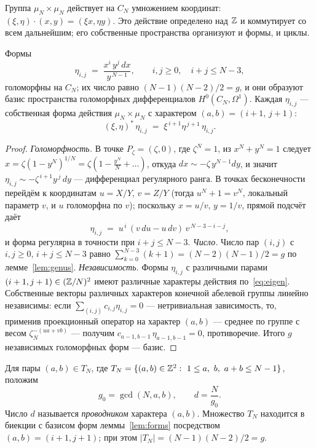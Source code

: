 Группа $\mu_N\times\mu_N$ действует на $C_N$ умножением координат:
$(\xi,\eta)\cdot(x,y)=(\xi x,\eta y)$. Это действие определено над
$\mathbb{Z}$ и коммутирует со всем дальнейшим; его собственные пространства
организуют и формы, и циклы.

\begin{lemma}\label{lem:forms}
Формы
\[
  \eta_{i,j} \;=\; \frac{x^i\,y^j\,dx}{y^{\,N-1}},
  \qquad i,j\ge 0,\quad i+j\le N-3,
\]
голоморфны на $C_N$; их число равно $(N-1)(N-2)/2=g$, и они образуют
базис пространства голоморфных дифференциалов $H^0(C_N,\Omega^1)$.
Каждая $\eta_{i,j}$ --- собственная форма действия $\mu_N\times\mu_N$
с характером $(a,b)=(i+1,\,j+1)$:
\begin{equation}\label{eq:eigen}
  (\xi,\eta)^*\,\eta_{i,j} \;=\; \xi^{\,i+1}\eta^{\,j+1}\,\eta_{i,j}.
\end{equation}
\end{lemma}

\begin{proof}
\emph{Голоморфность.} В точке $P_\zeta=(\zeta,0)$, где $\zeta^N=1$,
из $x^N+y^N=1$ следует $x=\zeta(1-y^N)^{1/N}=\zeta(1-\tfrac{y^N}{N}+
\dots)$, откуда $dx\sim-\zeta\,y^{N-1}dy$, и значит
$\eta_{i,j}\sim-\zeta^{\,i+1}y^{\,j}\,dy$ --- дифференциал регулярного
ранга. В точках бесконечности перейдём к координатам $u=X/Y$,
$v=Z/Y$ (тогда $u^N+1=v^N$, локальный параметр $v$, и $u$ голоморфна
по $v$); поскольку $x=u/v$, $y=1/v$, прямой подсчёт даёт
\begin{equation}\label{eq:infinity}
  \eta_{i,j} \;=\; u^{\,i}\,(v\,du-u\,dv)\,v^{\,N-3-i-j},
\end{equation}
и форма регулярна в точности при $i+j\le N-3$.
\emph{Число.} Число пар $(i,j)$ с $i,j\ge0$, $i+j\le N-3$ равно
$\sum_{k=0}^{N-3}(k+1)=(N-2)(N-1)/2=g$ по лемме~\ref{lem:genus}.
\emph{Независимость.} Формы $\eta_{i,j}$ с различными парами
$(i+1,j+1)\in(\mathbb{Z}/N)^2$ имеют различные характеры действия
по~\eqref{eq:eigen}. Собственные векторы различных характеров конечной
абелевой группы линейно независимы: если
$\sum_{(i,j)}c_{i,j}\eta_{i,j}=0$ --- нетривиальная зависимость, то,
применив проекционный оператор на характер $(a,b)$ --- среднее по
группе с весом $\zeta_N^{-(ua+vb)}$ --- получим
$c_{a-1,b-1}\,\eta_{a-1,b-1}=0$, противоречие. Итого $g$ независимых
голоморфных форм --- базис.
\end{proof}

\begin{definition}\label{def:conductor}
Для пары $(a,b)\in T_N$, где
$T_N=\{(a,b)\in\mathbb{Z}^2:\ 1\le a,\ b,\ a+b\le N-1\}$, положим
\[
  g_0=\gcd(N,a,b),\qquad d=\frac{N}{g_0}.
\]
Число $d$ называется \emph{проводником} характера $(a,b)$. Множество
$T_N$ находится в биекции с базисом форм леммы~\ref{lem:forms}
посредством $(a,b)=(i+1,j+1)$; при этом
$|T_N|=(N-1)(N-2)/2=g$.
\end{definition}

